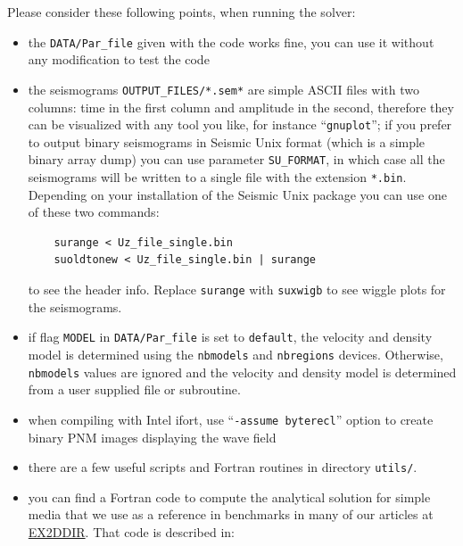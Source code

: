 Please consider these following points, when running the solver:
%
\begin{itemize}
\item the \texttt{DATA/Par\_file} given with the code works fine, you can use it without any modification to test the code

\item the seismograms \texttt{OUTPUT\_FILES/*.sem*} are simple ASCII files with two columns: time in the first column and amplitude in the second, therefore they can be visualized with any tool you like, for instance ``\texttt{gnuplot}''; if you prefer to output binary seismograms in Seismic Unix format (which is a simple binary array dump) you can use parameter \texttt{SU\_FORMAT}, in which case all the seismograms will be written to a single file with the extension \texttt{*.bin}.
Depending on your installation of the Seismic Unix package you can use one of these two commands:
%
\begin{verbatim}
    surange < Uz_file_single.bin
    suoldtonew < Uz_file_single.bin | surange
\end{verbatim}
%
to see the header info.
Replace \texttt{surange} with \texttt{suxwigb} to see wiggle plots for the seismograms.

\item if flag \texttt{MODEL} in \texttt{DATA/Par\_file} is set to \texttt{default}, the velocity and density model is determined using the \texttt{nbmodels} and \texttt{nbregions} devices.  Otherwise, \texttt{nbmodels} values are ignored and the velocity and density model is determined from a user supplied file or subroutine.

\item when compiling with Intel ifort, use ``\texttt{-assume byterecl}'' option to create binary PNM images displaying the wave field

\item there are a few useful scripts and Fortran routines in directory \texttt{utils/}.

\item you can find a Fortran code to compute the analytical solution for simple media that we use as a reference in benchmarks in many of our articles at
\href{http://www.spice-rtn.org/library/software/EX2DDIR}{EX2DDIR}. That code is described in: \cite{BeIfNiSk94}

\end{itemize}


